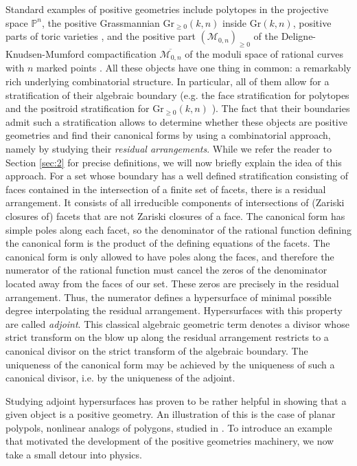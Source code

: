 \documentclass[12pt]{extarticle}
\theoremstyle{definition}
\begin{document}
Standard examples of positive geometries include polytopes in the projective space $\mathbb{P}^n$, the positive Grassmannian $\mathrm{Gr}_{\geq 0}(k,n)$ inside $\mathrm{Gr}(k,n)$, positive parts of toric varieties \cite[Section 5]{arkani2017positive}, and the positive part $(\mathcal{M}_{0,n})_{\geq 0}$ of the Deligne-Knudsen-Mumford compactification $\overline{\mathcal{M}_{0,n}}$ of the moduli space of rational curves with $n$ marked points \cite[Proposition 8.2]{arkani2021cluster}. All these objects have one thing in common: a remarkably rich underlying combinatorial structure. In particular, all of them allow for a stratification of their algebraic boundary (e.g. the face stratification for polytopes and the positroid stratification for $\mathrm{Gr}_{\geq 0}(k,n)$ \cite{postnikov}). The fact that their boundaries admit such a stratification allows to determine whether these objects are positive geometries and find their canonical forms by using a combinatorial approach, namely by studying their \emph{residual arrangements}. While we refer the reader to Section \ref{sec:2} for precise definitions, we will now briefly explain the idea of this approach. For a set whose boundary has a well defined stratification consisting of faces contained in the intersection of a finite set of facets, there is a residual arrangement.  It consists of all irreducible components of intersections of (Zariski closures of) facets that are not Zariski closures of a face. %
The canonical form has simple poles along each facet, so the denominator of the rational function defining the canonical form is the product of the defining equations of the facets. The canonical form is only allowed to have poles along the faces, and therefore the numerator of the rational function must cancel the zeros of the denominator located away from the faces of our set. These zeros are precisely in the residual arrangement. Thus, the numerator defines a hypersurface of minimal possible degree interpolating the residual arrangement. Hypersurfaces with this property are called \emph{adjoint}. This classical algebraic geometric term denotes a divisor whose strict transform on the blow up along the residual arrangement restricts to a canonical divisor on the strict transform of the algebraic boundary.
The uniqueness of the canonical form may be achieved by the uniqueness of such a canonical divisor, i.e. by the uniqueness of the adjoint.

Studying adjoint hypersurfaces has proven to be rather helpful in showing that a given object is a positive geometry. An illustration of this is the case of planar polypols, nonlinear analogs of polygons, studied in \cite{kohn2021adjoints}. To introduce an example that motivated the development of the positive geometries machinery, we now take a small detour into physics. 
\end{document}
